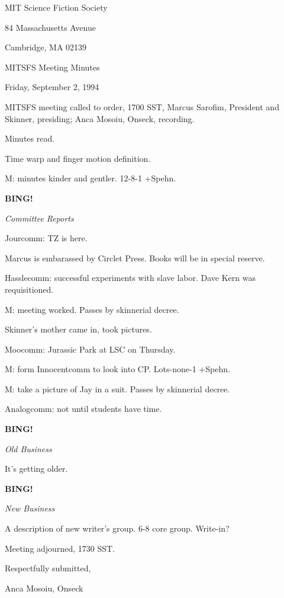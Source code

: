 \documentclass[12pt]{article}
\newcommand{\bing}{{\bf BING!} }
\newcommand{\goto}[1]{\bing \vskip 12pt \centerline{{\em{#1}}}}
\begin{document}
\begin{center}

MIT Science Fiction Society 

84 Massachusetts Avenue

Cambridge, MA 02139

\vspace{12pt}

MITSFS Meeting Minutes 

Friday, September 2, 1994

\end{center}
 
\vspace{18pt}

\setlength{\parskip}{6pt}

\noindent
MITSFS meeting called to order, 1700 SST,
Marcus Sarofim, President and Skinner, presiding; Anca Mosoiu, Onseck, recording.

Minutes read.

Time warp and finger motion definition.

M: minutes kinder and gentler. 12-8-1 +Spehn.

\goto{Committee Reports}

Jourcomm: TZ is here.

Marcus is embarassed by Circlet Press. Books will be in special reserve.

Hasslecomm: successful experiments with slave labor. Dave Kern was requisitioned.

M: meeting worked. Passes by skinnerial decree.

Skinner's mother came in, took pictures.

Moocomm: Jurassic Park at LSC on Thursday.

M: form Innocentcomm to look into CP. Lots-none-1 +Spehn.

M: take a picture of Jay in a suit. Passes by skinnerial decree.

Analogcomm: not until students have time.

\goto{Old Business}

It's getting older.

\goto{New Business}

A description of new writer's group. 6-8 core group. Write-in?

\vspace{12pt}

\noindent
Meeting adjourned, 1730 SST.

\vspace{18pt}

\centerline{Respectfully submitted,}
\centerline{Anca Mosoiu, Onseck}
\end{document}
